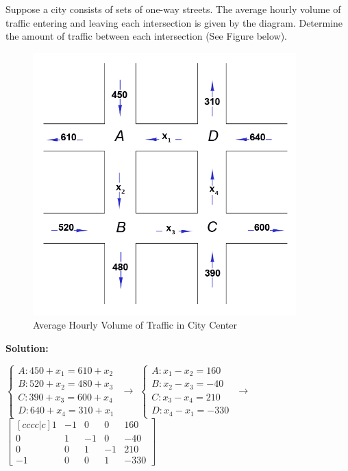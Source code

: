 \begin{example}
Suppose a city consists of sets of one-way streets.  The average hourly volume of traffic entering and leaving each intersection is given by the diagram.  Determine the amount of traffic between each intersection (See Figure below).
        \begin{figure}[htbp] %
           \centering
           \includegraphics[width=4in]{figures/trafficflow.png} 
           \caption{Average Hourly Volume of Traffic in City Center}
           \label{fig:trafficflow}
        \end{figure}
        



{\bf Solution:}

$ \begin{cases} A: 450 + x_1  = 610 + x_2 \\  B: 520 + x_2 = 480 + x_3 \\ C: 390 + x_3 = 600 + x_4 \\ D: 640 + x_4 = 310 + x_1  \end{cases} $
 $\rightarrow$
$ \begin{cases} A:  x_1 - x_2  = 160 \\  B: x_2 - x_3 = -40  \\ C: x_3 - x_4 = 210 \\ D:  x_4 - x_1 = -330  \end{cases} $
 $\rightarrow$
$  \begin{bmatrix} [cccc|c]
1 & -1 & 0 & 0 & 160 \\
0 & 1 & -1 & 0 & -40 \\
0 & 0 & 1 & -1 & 210 \\
-1 & 0 & 0 & 1 & -330 
  \end{bmatrix} $


\end{example}
